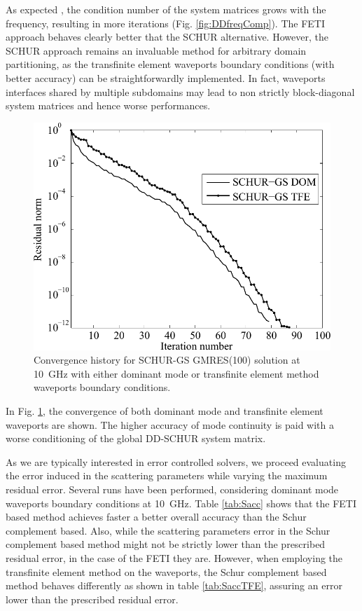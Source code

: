 As expected \cite{dyczij1999efficient}, the condition number of the system matrices grows with the frequency, resulting in more iterations (Fig. \ref{fig:DDfreqComp}). The FETI approach behaves clearly better that the SCHUR alternative. However, the SCHUR approach remains an invaluable method for arbitrary domain partitioning, as the transfinite element waveports boundary conditions (with better accuracy) can be straightforwardly implemented. In fact, waveports interfaces shared by multiple subdomains may lead to non strictly block-diagonal system matrices and hence worse performances.

\begin{figure}[h!]
\centering
\includegraphics[width=13.4cm]{schurdomtfe}
\caption{Convergence history for SCHUR-GS GMRES(100) solution at 10~GHz with either dominant mode or transfinite element method waveports boundary conditions.}
\label{fig:schurdomtfe}
\end{figure}

In Fig. \ref{fig:schurdomtfe}, the convergence of both dominant mode and transfinite element waveports are shown. The higher accuracy of mode continuity is paid with a worse conditioning of the global DD-SCHUR system matrix.

As we are typically interested in error controlled solvers, we proceed evaluating the error induced in the scattering parameters while varying the maximum residual error. Several runs have been performed, considering dominant mode waveports boundary conditions at 10~GHz. Table \ref{tab:Sacc} shows that the FETI based method achieves faster a better overall accuracy than the Schur complement based. Also, while the scattering parameters error in the Schur complement based method might not be strictly lower than the prescribed residual error, in the case of the FETI they are.
However, when employing the transfinite element method on the waveports, the Schur complement based method behaves differently as shown in table \ref{tab:SaccTFE}, assuring an error lower than the prescribed residual error. 

